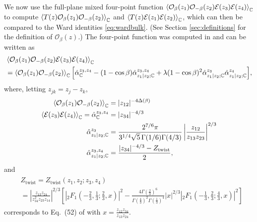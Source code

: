 \documentclass[a4paper,11pt]{article}
\begin{document}
We now use the full-plane mixed four-point function $\Braket{\mathcal{O}_{\beta}(z_1) \mathcal{O}_{-\beta}(z_2) {\mathcal E}(z_3) {\mathcal E}(z_4)}_\mathbb{C}$ to compute $\braket{T(z)\mathcal{O}_\beta(z_1)\mathcal{O}_{-\beta}(z_2)}_\mathbb{C}$ and $\braket{T(z)\mathcal{E}(z_1)\mathcal{E}(z_2)}_\mathbb{C}$, which can then be compared to the Ward identities \eqref{eq:wardbulk}. (See Section \ref{sec:definitions} for the definition of $\mathcal{O}_\beta(z)$.) The four-point function was computed in \cite{camia2021scalar} and can be written as
\begin{align}
\begin{split} \label{eq:OOEE}
    & \Braket{\mathcal{O}_{\beta}(z_1) \mathcal{O}_{-\beta}(z_2) {\mathcal E}(z_3) {\mathcal E}(z_4)}_\mathbb{C} \\
    & = \Braket{\mathcal{O}_{\beta}(z_1) \mathcal{O}_{-\beta}(z_2)}_\mathbb{C} \Big[ \hat{\alpha}_\mathbb{C}^{z_3,z_4} - (1-\cos\beta) \hat{\alpha}^{z_3,z_4}_{z_1|z_2;\mathbb{C}} + \lambda (1-\cos\beta)^2 \hat{\alpha}^{z_3}_{z_1|z_2;\mathbb{C}} \hat{\alpha}^{z_4}_{z_1|z_2;\mathbb{C}} \Big],
\end{split}
\end{align}
where, letting $z_{jk}=z_j-z_k$, 
\begin{align}
\begin{split} \label{eq:alphas}
        \Braket{\mathcal{O}_{\beta}(z_1) \mathcal{O}_{-\beta}(z_2)}_\mathbb{C} &= |z_{12}|^{-4\Delta(\beta)} \\
        \Braket{\mathcal{E}(z_3) \mathcal{E}(z_4)}_\mathbb{C} = \hat\alpha^{z_3,z_4}_\mathbb{C} &= |z_{34}|^{-4/3} \\
        \hat{\alpha}^{z_3}_{z_1|z_2;{\mathbb C}} & = \frac{ 2^{7/6} \pi}{3^{1/4} \sqrt{5} \, \Gamma(1/6)\Gamma(4/3)} \left| \frac{z_{12}}{z_{13}z_{23}} \right|^{2/3} \\
        \hat\alpha^{z_3,z_4}_{z_1|z_2;\mathbb{C}} & = \frac{|z_{34}|^{-4/3}-Z_{\text{twist}}}{2},
\end{split}
\end{align}
and
\begin{align}
\begin{split} \label{ztwist}
    & Z_{\text{twist}} = Z_{\text{twist}}(z_1,z_2;z_3,z_4) \\
    &= \left| \frac{z_{13} z_{24} }{ z_{34}^2 z_{23} z_{14} } \right|^{2/3} \left[
    \left| {}_2 F_1\left( -\frac{2}{3}, \frac{1}{3}; \frac{2}{3}, x \right)  \right|^2 - \frac{4\Gamma\left( \frac{2}{3} \right)^6}{\Gamma\left( \frac{4}{3} \right)^2 \Gamma\left( \frac{1}{3} \right)^4} |x|^{2/3} \left| {}_2 F_1\left( -\frac{1}{3}, \frac{2}{3}; \frac{4}{3}, x \right) \right|^2
    \right]
\end{split}
\end{align}
corresponds to Eq.\ (52) of \cite{Simmons_2009} with $x=\frac{z_{12}z_{34}}{z_{13}z_{24}}$.
\end{document}
